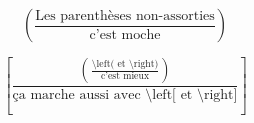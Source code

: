 \begin{minipage}{0.495\textwidth}
\begin{equation*}
    (\frac{\mbox{Les parenthèses non-assorties}}{\mbox{c'est moche}})
\end{equation*}
\end{minipage}
\begin{minipage}{0.495\textwidth}
\begin{equation*}
     \left[ \frac{\left(\frac{\text{\textbackslash left( et  \textbackslash right)}}{\mbox{c'est mieux}} \right)}{\mbox{ça marche aussi avec \textbackslash left[ et \textbackslash right]}} \right]
\end{equation*}
\end{minipage}

